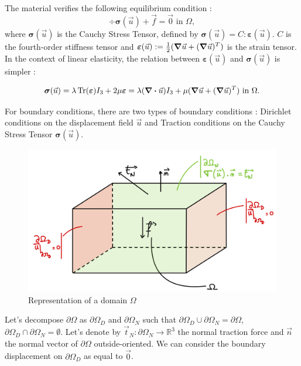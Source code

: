 \documentclass[a4paper,12pt,twoside]{report}
\newcommand{\mtr}{\mathbb{R}}
\begin{document}
The material verifies the following equilibrium condition : 
\begin{equation}
\label{eq:equilibrium}
    \div \boldsymbol{\sigma} (\vec u) + \vec f = \vec 0 \text{ in } \Omega,
\end{equation}
where $\boldsymbol{\sigma} (\vec u)$ is the Cauchy Stress Tensor, defined by $\boldsymbol{\sigma} (\vec u) = C : \boldsymbol{\varepsilon} (\vec u)$. $C$ is the fourth-order stiffness tensor and $\boldsymbol{\varepsilon} (\vec u) := \frac{1}{2}(\grad \vec u + (\grad \vec u)^T)$ is the strain tensor. In the context of linear elasticity, the relation between $\boldsymbol{\varepsilon} (\vec u)$ and $\boldsymbol{\sigma} (\vec u)$ is simpler : 

\begin{equation}
\label{eq:hooklaw}
    \boldsymbol{\sigma} (\vec u) = \lambda \Tr(\boldsymbol{\varepsilon}) I_3 + 2\mu \boldsymbol \varepsilon = \lambda (\div \vec u) I_3 + \mu (\grad \vec u + (\grad \vec u)^T) \text{ in } \Omega.
\end{equation}

For boundary conditions, there are two types of boundary conditions : Dirichlet conditions on the displacement field $\vec u$ and Traction conditions on the Cauchy Stress Tensor $\boldsymbol \sigma (\vec u)$. 


\begin{figure}[!h]
	\centering
	\includegraphics[width=0.61\linewidth]{figures/omega_domain}
	\caption{Representation of a domain $\Omega$}
	\label{fig:omegadomain}
\end{figure}

Let's decompose $\partial \Omega$ as $\partial \Omega_D$ and $\partial \Omega_N$ such that $\partial \Omega_D \cup \partial \Omega_N = \partial \Omega$, $\partial \Omega_D \cap \partial \Omega_N = \emptyset$. Let's denote by $\vec t_N : \partial \Omega_N \rightarrow \mtr^3$ the normal traction force and $\vec n$ the normal vector of $\partial \Omega$ outside-oriented. We can consider the boundary displacement on $\partial \Omega_D$ as equal to $\vec 0$. 
\end{document}

